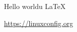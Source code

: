\documentclass{article}
\begin{document}
Hello worldu \LaTeX

\url{https://linuxconfig.org}
\end{document}

